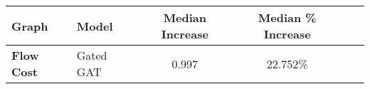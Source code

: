 \begin{tabular}{llcccc}
\toprule
\textbf{Graph} & \textbf{Model} & \textbf{Median Increase} & \textbf{Median \% Increase}\\
\midrule
\textbf{Flow Cost} & Gated GAT & 0.997 & 22.752\%\\
\bottomrule
\end{tabular}